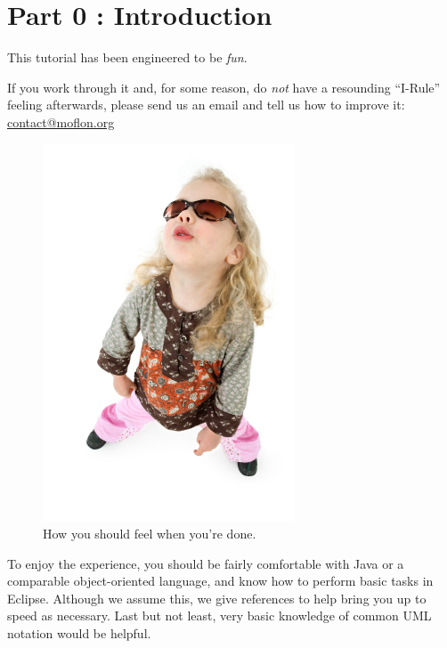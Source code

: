 \chapter{Part 0 : Introduction}

This tutorial has been engineered to be \emph{fun}.

If you work through it and, for some reason, do \emph{not} have a resounding \mbox{``I-Rule''} feeling afterwards, please send us an email and tell us how to improve it: \href{mailto:contact@moflon.org}{contact@moflon.org}

\begin{figure}[htp]
\begin{center}
	\includegraphics[height=0.45\textheight]{../introduction_images/i-rule}
	\caption{How you should feel when you're done.}
	\label{i-rule}
\end{center}
\end{figure}
\break
 


To enjoy the experience, you should be fairly comfortable with Java or a comparable object-oriented language, and know how to perform basic tasks in Eclipse.  Although we assume this, we give references to help bring you up to speed as necessary.  
Last but not least, very basic knowledge of common UML notation would be helpful.

